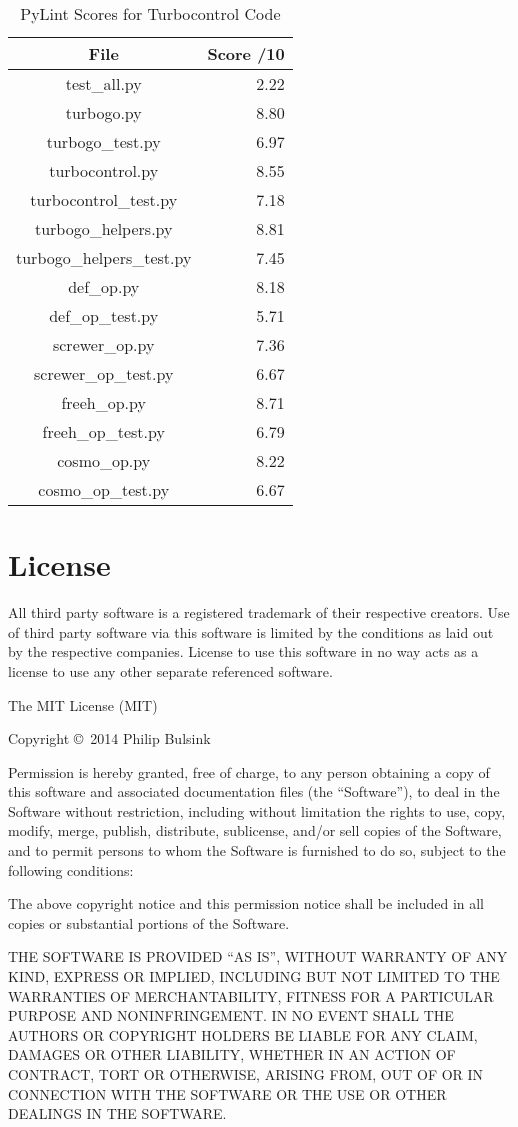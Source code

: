 \begin{table}[!h]
  \centering
  \caption{PyLint Scores for Turbocontrol Code}
    \begin{tabular}{cr}
    \toprule
    File  & Score /10 \\
    \midrule
    test\_all.py & 2.22 \\
    turbogo.py & 8.80 \\
    turbogo\_test.py & 6.97 \\
    turbocontrol.py & 8.55 \\
    turbocontrol\_test.py & 7.18 \\
    turbogo\_helpers.py & 8.81 \\
    turbogo\_helpers\_test.py & 7.45 \\
    def\_op.py & 8.18 \\
    def\_op\_test.py & 5.71 \\
    screwer\_op.py & 7.36 \\
    screwer\_op\_test.py & 6.67 \\
    freeh\_op.py & 8.71 \\
    freeh\_op\_test.py & 6.79 \\
    cosmo\_op.py & 8.22 \\
    cosmo\_op\_test.py & 6.67 \\
    \bottomrule
    \end{tabular}%
  \label{tab.pylint}
\end{table}%

\section{License}

All third party software is a registered trademark of their respective
creators. Use of third party software via this software is limited by
the conditions as laid out by the respective companies. License to use
this software in no way acts as a license to use any other separate
referenced software.

The MIT License (MIT)

Copyright \copyright~2014 Philip Bulsink

Permission is hereby granted, free of charge, to any person obtaining a
copy of this software and associated documentation files (the
``Software''), to deal in the Software without restriction, including
without limitation the rights to use, copy, modify, merge, publish,
distribute, sublicense, and/or sell copies of the Software, and to
permit persons to whom the Software is furnished to do so, subject to
the following conditions:

The above copyright notice and this permission notice shall be included
in all copies or substantial portions of the Software.

THE SOFTWARE IS PROVIDED ``AS IS'', WITHOUT WARRANTY OF ANY KIND,
EXPRESS OR IMPLIED, INCLUDING BUT NOT LIMITED TO THE WARRANTIES OF
MERCHANTABILITY, FITNESS FOR A PARTICULAR PURPOSE AND NONINFRINGEMENT.
IN NO EVENT SHALL THE AUTHORS OR COPYRIGHT HOLDERS BE LIABLE FOR ANY
CLAIM, DAMAGES OR OTHER LIABILITY, WHETHER IN AN ACTION OF CONTRACT,
TORT OR OTHERWISE, ARISING FROM, OUT OF OR IN CONNECTION WITH THE
SOFTWARE OR THE USE OR OTHER DEALINGS IN THE SOFTWARE.

